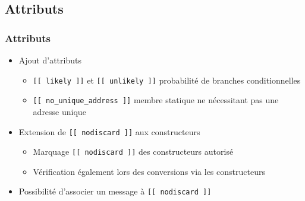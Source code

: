 \documentclass[C++.tex]{subfiles}
\begin{document}
\subsection*{Attributs}
\begin{frame}[fragile]
	\frametitle{Attributs}
	\begin{itemize}
		\item Ajout d'attributs
		\begin{itemize}
			\item \lstinline|[[ likely ]]| et \lstinline|[[ unlikely ]]| probabilité de branches conditionnelles


			\item \lstinline|[[ no_unique_address ]]| membre statique ne nécessitant pas une adresse unique

		\end{itemize}

		\item Extension de \lstinline|[[ nodiscard ]]| aux constructeurs
		\begin{itemize}
			\item Marquage \lstinline|[[ nodiscard ]]| des constructeurs autorisé


			\item Vérification également lors des conversions via les constructeurs


		\end{itemize}
		\item Possibilité d'associer un message à \lstinline|[[ nodiscard ]]|

	\end{itemize}


\end{frame}
\end{document}
